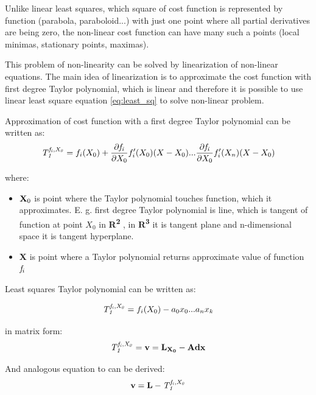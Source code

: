 \documentclass[a4paper,12pt]{report}
\newcommand{\ematr}[1]{
{\bf #1}
}
\newcommand{\evect}[1]{
{\bf #1}
}
\newcommand{\eucl}[1]{
{\bf R\textsuperscript{#1}}
}
\newcommand{\efunc}[1]{
{\it #1}
}
\begin{document}
Unlike linear least squares, which square of cost function is represented by function  (parabola, paraboloid...) with just one point where all
partial derivatives are being zero, the non-linear cost function can have many such a points (local minimas, stationary points, maximas). 

This problem of non-linearity can be solved by linearization of non-linear equations.
The main idea of linearization is to approximate the cost function with first degree Taylor polynomial,
which is linear and therefore it is possible to use linear least square equation \eqref{eq:least_sq} 
to solve non-linear problem. 

Approximation of cost function with a first degree Taylor polynomial can be written as:
\begin{equation}
\efunc{T^{f_{i}, X_{0}}_{1}} = f_{i}(X_{0}) + \frac{\partial \efunc{f_{i}}}{\partial {X_{0}}} f_{i}'(X_{0}) (X -  X_{0}) 
... \frac{\partial \efunc{f_{i}}}{\partial {X_{0}}} f_{i}'(X_{n}) (X -  X_{0}) 
\end{equation}

where:
\begin{itemize}
\item $\evect{X}_{0}$ is point where the Taylor polynomial touches function, which it approximates. E. g. first degree Taylor polynomial 
      is line, which is tangent of function at point $X_{0}$ in \eucl{2}, in \eucl{3} it is tangent plane and n-dimensional 
      space it is tangent hyperplane.
\item \evect{X} is point where a Taylor polynomial returns approximate value of function $\efunc{f}_{i}$
\end{itemize}


Least squares Taylor polynomial can be written as:

\begin{equation}
\efunc{T^{f_{i}, X_{0}}_{1}} = f_{i}(X_{0}) - a_{0} x_{0} ... a_{n} x_{k} 
\end{equation} 

in matrix form:
\begin{equation}
\efunc{T^{f_{i}, X_{0}}_{1}} = \evect{v} = \evect{L_{X_{0}}} - \ematr{A}\evect{dx}
\end{equation} 

And analogous equation to \label{eq:least_v} can be derived:
\begin{equation}
\evect{v} = \evect{L} - \efunc{T^{f_{i}, X_{0}}_{1}}
\end{equation} 
\end{document}
